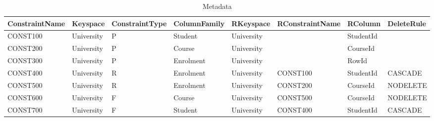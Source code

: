 \begin{table}[h] \label{texp:ListConstraints}
\centering
\caption{Metadata}	
	\begin{tabular}{CCC CCC CC}
		\toprule
		\bfseries ConstraintName & \bfseries Keyspace & \bfseries ConstraintType &
		\bfseries ColumnFamily & \bfseries RKeyspace & \bfseries RConstraintName &
		\bfseries RColumn & \bfseries DeleteRule\\
		\midrule
		CONST100 & University & P & Student & University & & StudentId &\\
		\rc CONST200 & University & P & Course & University & & CourseId &\\
		CONST300 & University & P & Enrolment & University & & RowId &\\
		\rc CONST400 & University & R & Enrolment & University & CONST100 & StudentId
		& CASCADE\\
		CONST500 & University & R & Enrolment & University & CONST200 & CourseId &
		NODELETE\\
		\rc CONST600 & University & F & Course & University & CONST500 & CourseId &
		NODELETE\\
		CONST700 & University & F & Student & University & CONST400 & StudentId &
		CASCADE\\
		\bottomrule 
	\end{tabular}
\end{table}

% 	
% 			
% 			


